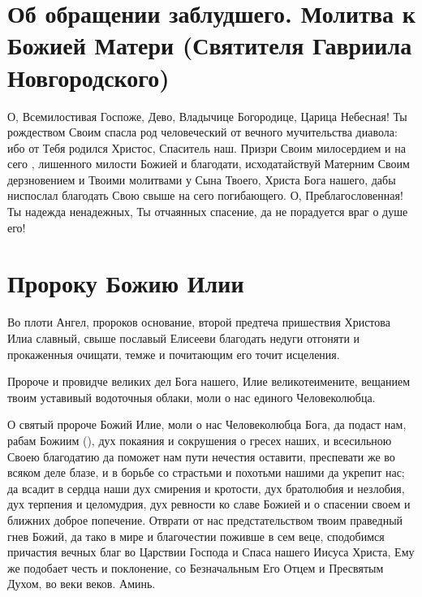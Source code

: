 \section{Об обращении заблудшего.  Молитва к Божией Матери  (Святителя Гавриила Новгородского)}\begin{mymulticols}


О, Всемилостивая Госпоже, Дево, Владычице Богородице, Царица Небесная! Ты рождеством Своим спасла род человеческий от вечного мучительства диавола: ибо от Тебя родился Христос, Спаситель наш. Призри Своим милосердием и на сего , лишенного милости Божией и благодати, исходатайствуй Матерним Своим дерзновением и Твоими молитвами у Сына Твоего, Христа Бога нашего, дабы ниспослал благодать Свою свыше на сего погибающего. О, Преблагословенная! Ты надежда ненадежных, Ты отчаянных спасение, да не порадуется враг о душе его! 

\end{mymulticols}

\mychapterending


 

\section{Пророку Божию Илии}\begin{mymulticols}
 


Во плоти Ангел, пророков основание, второй предтеча пришествия Христова Илиа славный, свыше пославый Елисееви благодать недуги отгоняти и прокаженныя очищати, темже и почитающим его точит исцеления.


Пророче и провидче великих дел Бога нашего, Илие великотеимените, вещанием твоим уставивый водоточныя облаки, моли о нас единого Человеколюбца.


О святый пророче Божий Илие, моли о нас Человеколюбца Бога, да подаст нам, рабам Божиим (), дух покаяния и сокрушения о гресех наших, и всесильною Своею благодатию да поможет нам пути нечестия оставити, преспевати же во всяком деле блазе, и в борьбе со страстьми и похотьми нашими да укрепит нас; да всадит в сердца наши дух смирения и кротости, дух братолюбия и незлобия, дух терпения и целомудрия, дух ревности ко славе Божией и о спасении своем и ближних доброе попечение. Отврати от нас предстательством твоим праведный гнев Божий, да тако в мире и благочестии поживше в сем веце, сподобимся причастия вечных благ во Царствии Господа и Спаса нашего Иисуса Христа, Ему же подобает честь и поклонение, со Безначальным Его Отцем и Пресвятым Духом, во веки веков. Аминь.


\end{mymulticols}


